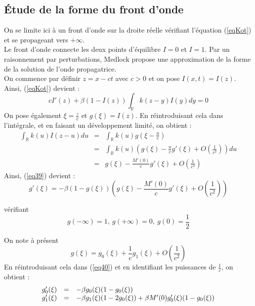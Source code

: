 \documentclass{article}
\begin{document}
\subsection{Étude de la forme du front d'onde}
\label{refForm}
On se limite ici à un front d'onde sur la droite réelle vérifiant l'équation (\ref{eqKot}) et se propageant vers $+\infty$.\\
Le front d'onde connecte les deux points d'équilibre $I=0$ et $I=1$. Par un raisonnement par perturbations, Medlock \cite{KotMedlock03} propose une approximation de la forme de la solution de l'onde propagatrice.\\
On commence par définir $z=x-ct$ avec $c>0$ et on pose $I(x,t)=I(z)$. Ainsi, (\ref{eqKot}) devient :
\begin{equation}\label{eq39}
	cI'(z)+\beta(1-I(z))\int_{\mathbb{R}}k(z-y)I(y)dy=0
\end{equation}
On pose également $\xi=\frac{z}{c}$ et $g(\xi)=I(z)$. En réintroduisant cela dans l'intégrale, et en faisant un développement limité, on obtient :
\begin{eqnarray*}
	\int_{\mathbb{R}}k(u)I(z-u)du&=&\int_{\mathbb{R}} k(u)g\left(\xi-\frac{u}{c}\right)\\
				&=& \int_{\mathbb{R}} k(u)\left( g(\xi)-\frac{u}{c} g'(\xi)+O\left(\frac{1}{c^2}\right)\right) du\\
				&=& g(\xi) -\frac{M'(0)}{c} g'(\xi) +O\left(\frac{1}{c^2}\right)
\end{eqnarray*}
Ainsi, (\ref{eq39}) devient :
\begin{equation}\label{eq40}
	g'(\xi)=-\beta(1-g(\xi))\left( g(\xi)-\frac{M'(0)}{c}g'(\xi)+O\left(\frac{1}{c^2}\right)\right)
\end{equation}

vérifiant
\begin{equation}\label{condBor}
	g(-\infty)=1,\ g(+\infty)=0,\ g(0)=\frac{1}{2}
\end{equation}

On note à présent \[g(\xi)=g_0(\xi)+\frac{1}{c} g_1(\xi)+O\left(\frac{1}{c^2}\right)\]
En réintroduisant cela dans (\ref{eq40}) et en identifiant les puissances de $\frac{1}{c}$, on obtient :
\begin{equation}\label{eqPert}
\begin{array}{r c l}
	g_0'(\xi)&=&-\beta g_0(\xi)(1-g_0(\xi))\\
	g_1'(\xi)&=&-\beta g_1(\xi)(1-2g_0(\xi))+\beta M'(0)g_0'(\xi)(1-g_0(\xi))
\end{array}
\end{equation}
\end{document}
